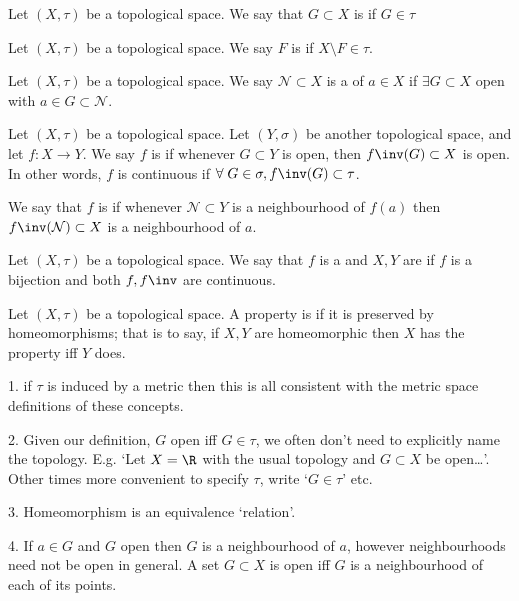 \begin{definition}[Open]
    Let $(X,\tau)$ be a topological space. We say that $G\subset X$ is  if $G\in \tau$
\end{definition}

\begin{definition}[Closed]
    Let $(X,\tau)$ be a topological space.
    We say $F$ is  if $X  \setminus F \in\tau$.
\end{definition}

\begin{definition}[Neighbourhood]
    Let $(X,\tau)$ be a topological space.
    We say $\mathcal{N} \subset X$ is a  of $a\in X$ if $\exists G\subset X$ open with $a\in G\subset \mathcal{N}$.
\end{definition}

\begin{definition}[Continuity]
    Let $(X,\tau)$ be a topological space.
    Let $(Y,\sigma)$ be another topological space, and let $f:X \to Y$. We say $f$ is  if whenever $G\subset Y$ is open, then $f\inv(G)\subset X$ is open.
    In other words, $f$ is continuous if $\forall \; G \in \sigma, f\inv(G) \subset \tau$.

    We say that $f$ is  if whenever $\mathcal{N} \subset Y$ is a neighbourhood of $f(a)$ then $f\inv(\mathcal{N})\subset X$ is a neighbourhood of $a$.
\end{definition}

\begin{definition}[Homeomorphisms]
    Let $(X,\tau)$ be a topological space.
    We say that $f$ is a  and $X,Y$ are  if $f$ is a bijection and both $f,f\inv$ are continuous.
\end{definition}

\begin{definition}[Topological]
    Let $(X,\tau)$ be a topological space.
    A property is  if it is preserved by homeomorphisms; that is to say, if $X,Y$ are homeomorphic then $X$ has the property iff $Y$ does.
\end{definition}

\begin{remark}
1. if $\tau$ is induced by a metric then this is all consistent with the metric space definitions of these concepts.

2. Given our definition, $G$ open iff $G\in \tau$, we often don't need to explicitly name the topology.
E.g. `Let $X=\R$ with the usual topology and $G\subset X$ be open\dots'.
Other times more convenient to specify $\tau$, write `$G\in \tau$' etc.

3. Homeomorphism is an equivalence `relation'.

4. If $a\in G$ and $G$ open then $G$ is a neighbourhood of $a$, however neighbourhoods need not be open in general. A set $G\subset X$ is open iff $G$ is a neighbourhood of each of its points.
\end{remark}

